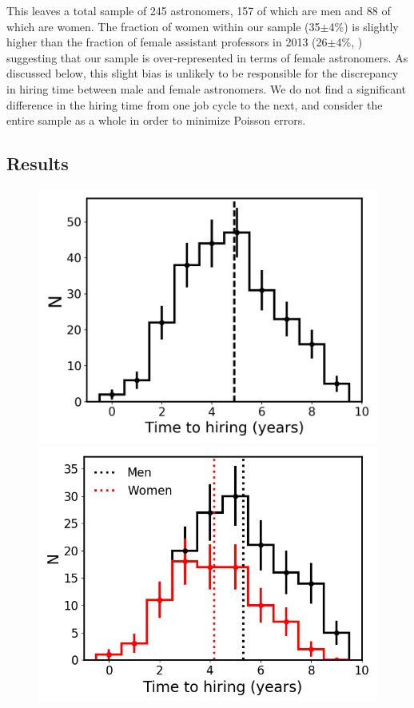 \documentclass[modern]{aastex62}
\begin{document}
This leaves a total sample of 245 astronomers, 157 of which are men and 88 of which are women. The fraction of women within our sample (35$\pm$4\%) is slightly higher than the fraction of female assistant professors in 2013 (26$\pm$4\%, \citet{hug14}) suggesting that our sample is over-represented in terms of female astronomers. As discussed below, this slight bias is unlikely to be responsible for the  discrepancy in hiring time between male and female astronomers. We do not find a significant difference in the hiring time from one job cycle to the next, and consider the entire sample as a whole in order to minimize Poisson errors. 

\subsection{Results}
\begin{figure}[!htb]
\center
\includegraphics[scale=.46]{full_hiring_time.png}
\includegraphics[scale=.46]{gender_hiring_time.png}

\end{figure}
\end{document}
